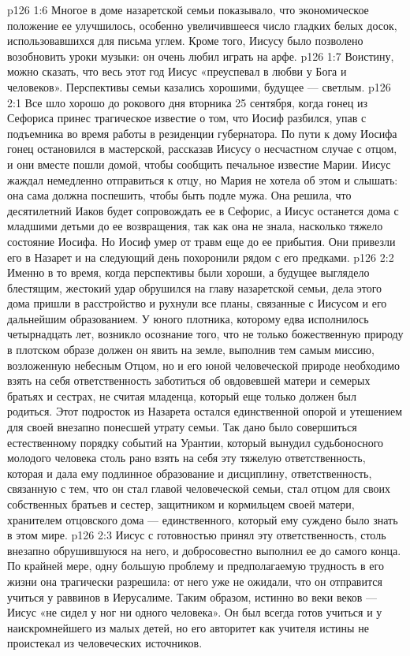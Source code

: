 \vs p126 1:6 Многое в доме назаретской семьи показывало, что экономическое положение ее улучшилось, особенно увеличившееся число гладких белых досок, использовавшихся для письма углем. Кроме того, Иисусу было позволено возобновить уроки музыки: он очень любил играть на арфе.
\vs p126 1:7 \pc Воистину, можно сказать, что весь этот год Иисус «преуспевал в любви у Бога и человеков». Перспективы семьи казались хорошими, будущее --- светлым.
\vs p126 2:1 Все шло хорошо до рокового дня вторника 25 сентября, когда гонец из Сефориса принес трагическое известие о том, что Иосиф разбился, упав с подъемника во время работы в резиденции губернатора. По пути к дому Иосифа гонец остановился в мастерской, рассказав Иисусу о несчастном случае с отцом, и они вместе пошли домой, чтобы сообщить печальное известие Марии. Иисус жаждал немедленно отправиться к отцу, но Мария не хотела об этом и слышать: она сама должна поспешить, чтобы быть подле мужа. Она решила, что десятилетний Иаков будет сопровождать ее в Сефорис, а Иисус останется дома с младшими детьми до ее возвращения, так как она не знала, насколько тяжело состояние Иосифа. Но Иосиф умер от травм еще до ее прибытия. Они привезли его в Назарет и на следующий день похоронили рядом с его предками.
\vs p126 2:2 \pc Именно в то время, когда перспективы были хороши, а будущее выглядело блестящим, жестокий удар обрушился на главу назаретской семьи, дела этого дома пришли в расстройство и рухнули все планы, связанные с Иисусом и его дальнейшим образованием. У юного плотника, которому едва исполнилось четырнадцать лет, возникло осознание того, что не только божественную природу в плотском образе должен он явить на земле, выполнив тем самым миссию, возложенную небесным Отцом, но и его юной человеческой природе необходимо взять на себя ответственность заботиться об овдовевшей матери и семерых братьях и сестрах, не считая младенца, который еще только должен был родиться. Этот подросток из Назарета остался единственной опорой и утешением для своей внезапно понесшей утрату семьи. Так дано было совершиться естественному порядку событий на Урантии, который вынудил судьбоносного молодого человека столь рано взять на себя эту тяжелую ответственность, которая и дала ему подлинное образование и дисциплину, ответственность, связанную с тем, что он стал главой человеческой семьи, стал отцом для своих собственных братьев и сестер, защитником и кормильцем своей матери, хранителем отцовского дома --- единственного, который ему суждено было знать в этом мире.
\vs p126 2:3 Иисус с готовностью принял эту ответственность, столь внезапно обрушившуюся на него, и добросовестно выполнил ее до самого конца. По крайней мере, одну большую проблему и предполагаемую трудность в его жизни она трагически разрешила: от него уже не ожидали, что он отправится учиться у раввинов в Иерусалиме. Таким образом, истинно во веки веков --- Иисус «не сидел у ног ни одного человека». Он был всегда готов учиться и у наискромнейшего из малых детей, но его авторитет как учителя истины не проистекал из человеческих источников.
